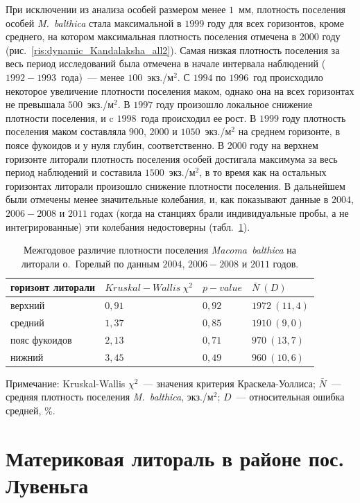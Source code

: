 При исключении из анализа особей размером менее $1$~мм, плотность поселения особей {\it M.~balthica} стала максимальной в $1999$ году для всех горизонтов, кроме среднего, на котором максимальная плотность поселения отмечена в $2000$ году (рис.~\ref{ris:dynamic_Kandalaksha_all2}).
Самая низкая плотность поселения за весь период исследований была отмечена в начале интервала наблюдений ($1992-1993$~года)~--- менее $100$~экз./м$^2$.
С $1994$ по $1996$~год происходило некоторое увеличение плотности поселения маком, однако она на всех горизонтах не превышала $500$~экз./м$^2$.
В $1997$ году произошло локальное снижение плотности поселения, и c $1998$~года происходил ее рост. 
В $1999$ году плотность поселения маком составляла $900$, $2000$ и $1050$~экз./м$^2$ на среднем горизонте, в поясе фукоидов и у нуля глубин, соответственно.
В $2000$ году на верхнем горизонте литорали плотность поселения особей достигала максимума за весь период наблюдений и составила  $1500$~экз./м$^2$, в то время как на остальных горизонтах литорали произошло снижение плотности поселения.
В дальнейшем были отмечены менее значительные колебания, и, как показывают данные в $2004$, $2006 - 2008$ и $2011$ годах (когда на станциях брали индивидуальные пробы, а не интегрированные) эти колебания недостоверны (табл.~\ref{tab:Goreliy_N2_Kruskal}).

	\begin{table}[p]
	\caption{Межгодовое различие плотности поселения {\it Macoma~balthica} на литорали о.~Горелый по данным $2004$, $2006 - 2008$ и $2011$ годов.}
	\label{tab:Goreliy_N2_Kruskal}
	\begin{tabularx}{\textwidth}{|*{4}{X|}} \hline
	горизонт литорали & $Kruskal-Wallis\ \chi^2$ & $p-value$ & $\bar{N} ~ (D)$ \\ 
	\hline
	верхний & $0,91$ & $0,92$ & $1972~(11,4)$ \\
	\hline
	средний & $1,37$ & $0,85$ & $1910~(9,0)$\\
	\hline
	пояс фукоидов & $2,13$ & $0,71$ & $970~(13,7)$ \\
	\hline
	нижний & $3,45$ & $0,49$ & $960~(10,6)$ \\
	\hline
	\end{tabularx}
	{\footnotesize Примечание: Kruskal-Wallis $\chi^2$~--- значения критерия Краскела-Уоллиса; $\bar{N}$~--- средняя плотность поселения {\it M.~balthica}, экз./м$^2$; $D$~--- относительная ошибка средней, \%.}
	\end{table}


		\section{Материковая литораль в районе пос. Лувеньга}

